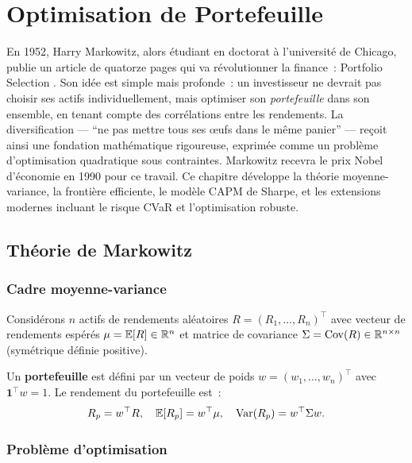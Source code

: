 \chapter{Optimisation de Portefeuille}
\label{ch:portefeuille}

En 1952, Harry Markowitz, alors \'etudiant en doctorat \`a l'universit\'e de Chicago, publie un article de quatorze pages qui va r\'evolutionner la finance~: \og Portfolio Selection \fg. Son id\'ee est simple mais profonde~: un investisseur ne devrait pas choisir ses actifs individuellement, mais optimiser son \emph{portefeuille} dans son ensemble, en tenant compte des corr\'elations entre les rendements. La diversification --- ``ne pas mettre tous ses \oe ufs dans le m\^eme panier'' --- re\c{c}oit ainsi une fondation math\'ematique rigoureuse, exprim\'ee comme un probl\`eme d'optimisation quadratique sous contraintes. Markowitz recevra le prix Nobel d'\'economie en 1990 pour ce travail. Ce chapitre d\'eveloppe la th\'eorie moyenne-variance, la fronti\`ere efficiente, le mod\`ele CAPM de Sharpe, et les extensions modernes incluant le risque CVaR et l'optimisation robuste.

\section{Th\'eorie de Markowitz}

\subsection{Cadre moyenne-variance}

\begin{definition}[Portefeuille]
Consid\'erons $n$ actifs de rendements al\'eatoires $R = (R_1, \ldots, R_n)^\top$
avec vecteur de rendements esp\'er\'es $\mu = \mathbb{E}[R] \in \mathbb{R}^n$ et matrice
de covariance $\Sigma = \mathrm{Cov}(R) \in \mathbb{R}^{n \times n}$ (sym\'etrique d\'efinie
positive).

Un \textbf{portefeuille} est d\'efini par un vecteur de poids
$w = (w_1, \ldots, w_n)^\top$ avec $\mathbf{1}^\top w = 1$. Le rendement
du portefeuille est~:
\[
    R_p = w^\top R, \quad \mathbb{E}[R_p] = w^\top\mu, \quad
    \mathrm{Var}(R_p) = w^\top\Sigma w.
\]
\end{definition}

\subsection{Probl\`eme d'optimisation}

